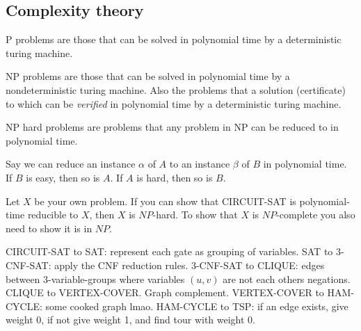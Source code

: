\documentclass[10pt, a4paper,landscape]{article}
\begin{document}
\begin{multicols*}{4}
\subsection{Complexity theory}
\begin{compactitem}
    \item[P] problems are those that can be solved in polynomial time by a deterministic turing machine.
    \item[NP] problems are those that can be solved in polynomial time by a nondeterministic turing machine.
        Also the problems that a solution (certificate) to which can be \emph{verified} in polynomial time by a deterministic turing machine.
    \item[NP hard] problems are problems that any problem in NP can be reduced to in polynomial time.
\end{compactitem}

Say we can reduce an instance $\alpha$ of $A$ to an instance $\beta$ of $B$ in polynomial time. If $B$ is easy, then so is $A$. If $A$ is hard, then so is $B$.

Let $X$ be your own problem. If you can show that CIRCUIT-SAT is polynomial-time reducible to $X$, then $X$ is $NP$-hard. To show that $X$ is $NP$-complete you also need to show it is in $NP$.

CIRCUIT-SAT to SAT: represent each gate as grouping of variables. SAT to 3-CNF-SAT: apply the CNF reduction rules. 3-CNF-SAT to CLIQUE: edges between 3-variable-groups where  variables $(u, v)$ are not each others negations. CLIQUE to VERTEX-COVER. Graph complement. VERTEX-COVER to HAM-CYCLE: some cooked graph lmao. HAM-CYCLE to TSP: if an edge exists, give weight 0, if not give weight 1, and find tour with weight 0.


\end{multicols*}
\end{document}
